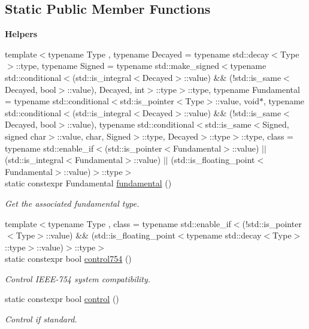 \subsection*{Static Public Member Functions}
\begin{Indent}{\bf Helpers}\par
\begin{DoxyCompactItemize}
\item 
{\footnotesize template$<$typename Type , typename Decayed  = typename std\-::decay$<$\-Type$>$\-::type, typename Signed  = typename std\-::make\-\_\-signed$<$typename std\-::conditional$<$(std\-::is\-\_\-integral$<$\-Decayed$>$\-::value) \&\& (!std\-::is\-\_\-same$<$\-Decayed, bool$>$\-::value), Decayed, int$>$\-::type$>$\-::type, typename Fundamental  = typename std\-::conditional$<$std\-::is\-\_\-pointer$<$\-Type$>$\-::value, void$\ast$, typename std\-::conditional$<$(std\-::is\-\_\-integral$<$\-Decayed$>$\-::value) \&\& (!std\-::is\-\_\-same$<$\-Decayed, bool$>$\-::value), typename std\-::conditional$<$std\-::is\-\_\-same$<$\-Signed, signed char$>$\-::value, char, Signed$>$\-::type, Decayed$>$\-::type$>$\-::type, class  = typename std\-::enable\-\_\-if$<$(std\-::is\-\_\-pointer$<$\-Fundamental$>$\-::value) $|$$|$ (std\-::is\-\_\-integral$<$\-Fundamental$>$\-::value) $|$$|$ (std\-::is\-\_\-floating\-\_\-point$<$\-Fundamental$>$\-::value)$>$\-::type$>$ }\\static constexpr Fundamental \hyperlink{exceptionmagrathea_1_1DataModel_a74cd4bf3739bb5dbf2983e1612ac931d}{fundamental} ()
\begin{DoxyCompactList}\small\item\em Get the associated fundamental type. \end{DoxyCompactList}\item 
{\footnotesize template$<$typename Type , class  = typename std\-::enable\-\_\-if$<$(!std\-::is\-\_\-pointer$<$\-Type$>$\-::value) \&\& (std\-::is\-\_\-floating\-\_\-point$<$typename std\-::decay$<$\-Type$>$\-::type$>$\-::value)$>$\-::type$>$ }\\static constexpr bool \hyperlink{exceptionmagrathea_1_1DataModel_add330c2a8784b741d7c245ed09f3f0aa}{control754} ()
\begin{DoxyCompactList}\small\item\em Control I\-E\-E\-E-\/754 system compatibility. \end{DoxyCompactList}\item 
static constexpr bool \hyperlink{exceptionmagrathea_1_1DataModel_a797174c507ea162e7e0edd1cefc4c5c0}{control} ()
\begin{DoxyCompactList}\small\item\em Control if standard. \end{DoxyCompactList}\end{DoxyCompactItemize}
\end{Indent}
